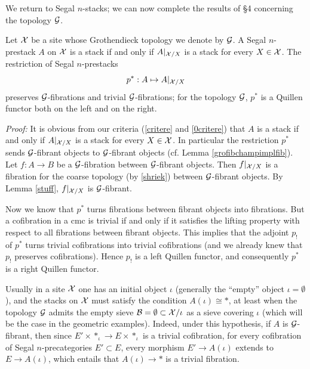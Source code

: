 \medskip


We return to Segal $n$-stacks; we can now complete the results of \S 4
concerning the topology ${\cal G}$.



\begin{lemma}
\label{grest}
Let ${\cal X}$ be a site whose Grothendieck topology we denote by ${\cal G}$. A Segal
$n$-prestack $A$ on ${\cal X}$ is a stack if and only if $A|_{{\cal X} /X}$ is a stack
for every $X\in {\cal X}$. The restriction of Segal $n$-prestacks
$$
p^{\ast}: A\mapsto A|_{{\cal X} /X}
$$
preserves ${\cal G}$-fibrations and trivial ${\cal G}$-fibrations; for the topology
${\cal G}$, $p^{\ast}$ is a Quillen functor both on the left and on the right.
\end{lemma}
{\em Proof:}
It is obvious from our criteria (\ref{critere} and \ref{0critere}) that $A$ is
a stack if and only if $A|_{{\cal X} /X}$ is a stack for every $X\in {\cal X}$. In
particular the restriction $p^{\ast}$ sends ${\cal G}$-fibrant objects to
${\cal G}$-fibrant objects (cf. Lemma \ref{grofibchampimplfib}). Let
$f: A\rightarrow B$ be a ${\cal G}$-fibration between ${\cal G}$-fibrant objects. Then
$f|_{{\cal X} /X}$ is a fibration for the coarse topology (by \ref{shriek}) between
${\cal G}$-fibrant objects. By Lemma \ref{stuff}, $f|_{{\cal X} /X}$ is ${\cal G}$-fibrant.

Now we know that $p^{\ast}$ turns fibrations between fibrant objects into
fibrations. But a cofibration in a cmc is trivial if and only if it satisfies
the lifting property with respect to all fibrations between fibrant objects.
This implies that the adjoint $p_!$ of $p^{\ast}$ turns trivial cofibrations
into trivial cofibrations (and we already knew that $p_!$ preserves
cofibrations). Hence $p_!$ is a left Quillen functor, and consequently
$p^{\ast}$ is a right Quillen functor.
\eop



Usually in a site ${\cal X}$ one has an initial object $\iota$ (generally the
``empty'' object $\iota = \emptyset$), and the stacks on ${\cal X}$ must satisfy the
condition $A(\iota )\cong \ast$, at least when the topology ${\cal G}$ admits the
empty sieve ${\cal B} = \emptyset \subset {\cal X} /\iota$ as a sieve covering $\iota$
(which will be the case in the geometric examples). Indeed, under this
hypothesis, if $A$ is ${\cal G}$-fibrant, then since
$E'\times \ast _{\iota} \rightarrow E\times \ast _{\iota}$ is a trivial
cofibration, for every cofibration of Segal $n$-precategories
$E'\subset E$, every morphism $E'\rightarrow A(\iota )$ extends to
$E\rightarrow A(\iota )$, which entails that $A(\iota )\rightarrow \ast$ is a
trivial fibration.


